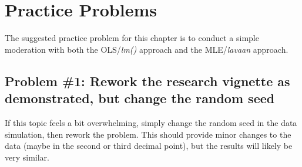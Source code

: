 \documentclass[
  11pt,
]{book}
\begin{document}
\hypertarget{practice-problems-6}{%
\section{Practice Problems}\label{practice-problems-6}}

The suggested practice problem for this chapter is to conduct a simple moderation with both the OLS/\emph{lm()} approach and the MLE/\emph{lavaan} approach.

\hypertarget{problem-1-rework-the-research-vignette-as-demonstrated-but-change-the-random-seed-2}{%
\subsection{Problem \#1: Rework the research vignette as demonstrated, but change the random seed}\label{problem-1-rework-the-research-vignette-as-demonstrated-but-change-the-random-seed-2}}

If this topic feels a bit overwhelming, simply change the random seed in the data simulation, then rework the problem. This should provide minor changes to the data (maybe in the second or third decimal point), but the results will likely be very similar.
\end{document}
